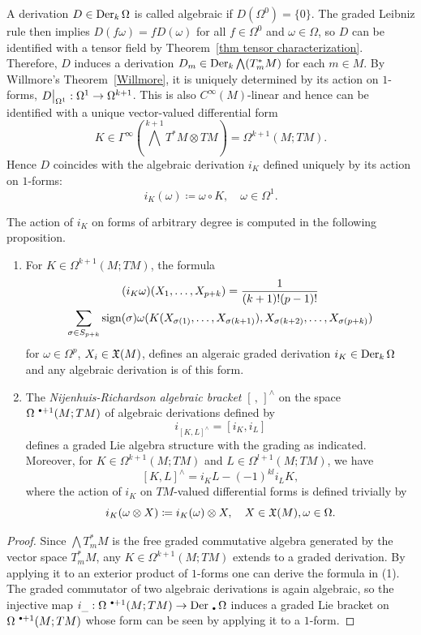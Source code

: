 \begin{defn}
    A derivation $D\in\operatorname{Der}_k\Omega$ is called algebraic if $D(\Omega^0)=\{0\}$. The graded Leibniz rule then implies $D(f\omega)=fD(\omega)$ for all $f\in \Omega^0$ and $\omega\in \Omega$, so $D$ can be identified with a tensor field by Theorem~\ref{thm tensor characterization}. Therefore, $D$ induces a derivation $D_m\in \operatorname{Der}_k \bigwedge (T^\ast_m M)$ for each $m\in M$. By Willmore's Theorem~\ref{Willmore}, it is uniquely determined by its action on $1$-forms, $\restr{D}{\Omega^1}:\Omega^1\to \Omega^{k+1}$. This is also $C^\infty(M)$-linear and hence can be identified with a unique vector-valued differential form 
    \[K\in \Gamma^\infty\left(\bigwedge^{k+1}T^\ast M\otimes TM\right)=\Omega^{k+1}(M;TM).\]
    Hence $D$ coincides with the algebraic derivation $i_K$ defined uniquely by its action on $1$-forms:
    \[i_K(\omega)\coloneqq \omega\circ K,\quad \omega\in\Omega^1.\]
\end{defn}

The action of $i_K$ on forms of arbitrary degree is computed in the following proposition.

\begin{prop}
    \begin{enumerate}[label=(\alph*)]
        \item For $K\in \Omega^{k+1}(M;TM)$, the formula 
        \begin{multline}
            (i_K\omega)(X_1,\ldots,X_{p+k})=\frac{1}{(k+1)!(p-1)!}\\\sum_{\sigma\in S_{p+k}}\operatorname{sign}(\sigma) \omega(K(X_{\sigma(1)},\ldots,X_{\sigma(k+1)}),X_{\sigma(k+2)},\ldots,X_{\sigma(p+k)})
        \end{multline}
        for $\omega\in\Omega^p$, $X_i\in\mathfrak{X}(M)$, defines an algeraic graded derivation $i_K\in \operatorname{Der}_k\Omega$ and any algebraic derivation is of this form.
        \item The \emph{Nijenhuis-Richardson algebraic bracket} $[\,,\,]^{\wedge}$ on the space $\Omega^{\smbullet +1}(M;TM)$ of algebraic derivations defined by 
        \[i_{[K,L]^{\wedge}}= [i_K,i_L]\]
        defines a graded Lie algebra structure with the grading as indicated. Moreover, for $K\in\Omega^{k+1}(M;TM)$ and $L\in\Omega^{l+1}(M;TM)$, we have 
        \[[K,L]^{\wedge}=i_K L-(-1)^{kl}i_L K,\]
        where the action of $i_K$ on $TM$-valued differential forms is defined trivially by
        \[i_K(\omega\otimes X)\coloneqq i_K(\omega)\otimes X,\quad X\in\mathfrak{X}(M),\omega\in\Omega.\]
    \end{enumerate}
\end{prop}
\begin{proof}
    Since $\bigwedge T^\ast_m M$ is the free graded commutative algebra generated by the vector space $T^\ast_m M$, any $K\in \Omega^{k+1}(M;TM)$ extends to a graded derivation. By applying it to an exterior product of $1$-forms one can derive the formula in (1). The graded commutator of two algebraic derivations is again algebraic, so the injective map $i_{\_}:\Omega^{\smbullet +1}(M;TM)\to \Der_{\smbullet}\Omega$ induces a graded Lie bracket on $\Omega^{\smbullet+1}(M;TM)$ whose form can be seen by applying it to a $1$-form.
\end{proof}


